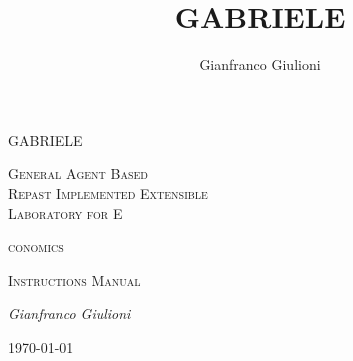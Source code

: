 \documentclass{book}
\title{GABRIELE}
\author{Gianfranco Giulioni}
\begin{document}
 
\begin{titlepage}

	\begin{center}
	{\color{blue}\scshape\Huge GABRIELE \par}
	\end{center}

	\vspace{2cm}

	\noindent
	{\color{blue}\scshape\Huge G}{\scshape\LARGE eneral} 
	{\color{blue}\scshape\Huge A}{\scshape\LARGE gent} 
	{\color{blue}\scshape\Huge B}{\scshape\LARGE ased}\\
	{\color{blue}\scshape\Huge R}{\scshape\LARGE epast} \hskip7mm 
	{\color{blue}\scshape\Huge I}{\scshape\LARGE mplemented}  
	{\color{blue}\scshape\Huge E}{\scshape\LARGE xtensible}\\
	{\color{blue}\scshape\Huge L}{\scshape\LARGE aboratory} \hskip2.5mm
	{\scshape\large for} \hskip2.5mm
	{\color{blue}\scshape\Huge E}{\scshape\LARGE conomics \par}



 
	
	\vspace{1.5cm}
	\noindent
	{\scshape\Huge Instructions Manual \par}

	\vspace{2cm}
	\noindent
	{\Large\itshape Gianfranco Giulioni\par}
	\vfill


	{\large \today\par}
\end{titlepage}
\end{document}
